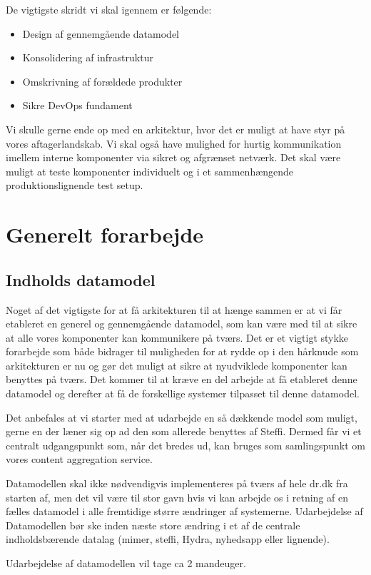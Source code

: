 \documentclass{article}
\begin{document}
De vigtigste skridt vi skal igennem er følgende:
\begin{itemize}
\item Design af gennemgående datamodel
\item Konsolidering af infrastruktur
\item Omskrivning af forældede produkter
\item Sikre DevOps fundament
\end{itemize}
Vi skulle gerne ende op med en arkitektur, hvor det er muligt at have styr på vores aftagerlandskab. Vi skal også have mulighed for hurtig kommunikation imellem interne komponenter via sikret og afgrænset netværk. Det skal være muligt at teste komponenter individuelt og i et sammenhængende produktionslignende test setup.

\section{Generelt forarbejde}
\subsection{Indholds datamodel}
Noget af det vigtigste for at få arkitekturen til at hænge sammen er at vi får etableret en generel og gennemgående datamodel, som kan være med til at sikre at alle vores komponenter kan kommunikere på tværs. Det er et vigtigt stykke forarbejde som både bidrager til muligheden for at rydde op i den hårknude som arkitekturen er nu og gør det muligt at sikre at nyudviklede komponenter kan benyttes på tværs. Det kommer til at kræve en del arbejde at få etableret denne datamodel og derefter at få de forskellige systemer tilpasset til denne datamodel.

Det anbefales at vi starter med at udarbejde en så dækkende model som muligt, gerne en der læner sig op ad den som allerede benyttes af Steffi. Dermed får vi et centralt udgangspunkt som, når det bredes ud, kan bruges som samlingspunkt om vores content aggregation service.

Datamodellen skal ikke nødvendigvis implementeres på tværs af hele dr.dk fra starten af, men det vil være til stor gavn hvis vi kan arbejde os i retning af en fælles datamodel i alle fremtidige større ændringer af systemerne.
Udarbejdelse af Datamodellen bør ske inden næste store ændring i et af de centrale indholdsbærende datalag (mimer, steffi, Hydra, nyhedsapp eller lignende).

Udarbejdelse af datamodellen vil tage ca 2 mandeuger.
\end{document}

